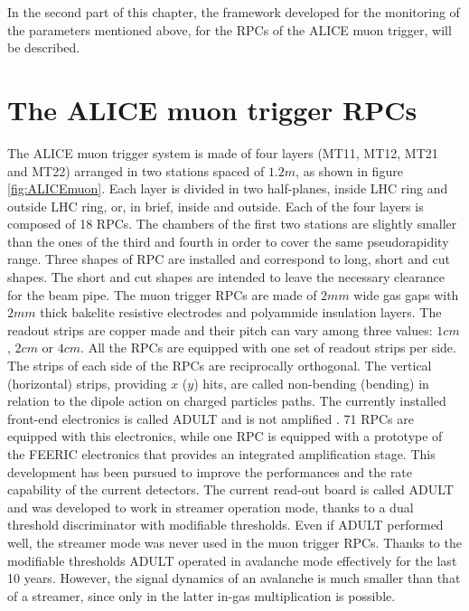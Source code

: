 
In the second part of this chapter, the framework developed for the monitoring of the parameters mentioned above, for the RPCs of the ALICE muon trigger, will be described.

\section{The ALICE muon trigger RPCs}
The ALICE muon trigger system is made of four layers (MT11, MT12, MT21 and MT22) arranged in two stations spaced of $1.2m$, as shown in figure \ref{fig:ALICEmuon}.
Each layer is divided in two half-planes, inside LHC ring and outside LHC ring, or, in brief, inside and outside.
Each of the four layers is composed of 18 RPCs.
The chambers of the first two stations are slightly smaller than the ones of the third and fourth in order to cover the same pseudorapidity range.
Three shapes of RPC are installed and correspond to long, short and cut shapes.
The short and cut shapes are intended to leave the necessary clearance for the beam pipe.
The muon trigger RPCs are made of $2mm$ wide gas gaps with $2mm$ thick bakelite resistive electrodes and polyammide insulation layers.
The readout strips are copper made and their pitch can vary among three values: $1cm$, $2cm$ or $4cm$.
All the RPCs are equipped with one set of readout strips per side.
The strips of each side of the RPCs are reciprocally orthogonal.
The vertical (horizontal) strips, providing $x$ ($y$) hits, are called non-bending (bending) in relation to the dipole action on charged particles paths.
The currently installed front-end electronics is called ADULT and is not amplified \cite{Dupieux:2003bw}.
71 RPCs are equipped with this electronics, while one RPC is equipped with a prototype of the FEERIC electronics \cite{Marchisone:2017bcb} that provides an integrated amplification stage.
This development has been pursued to improve the performances and the rate capability of the current detectors.
The current read-out board is called ADULT and was developed to work in streamer operation mode, thanks to a dual threshold discriminator with modifiable thresholds.
Even if ADULT performed well, the streamer mode was never used in the muon trigger RPCs.
Thanks to the modifiable thresholds ADULT operated in avalanche mode effectively for the last 10 years.
However, the signal dynamics of an avalanche is much smaller than that of a streamer, since only in the latter in-gas multiplication is possible.

